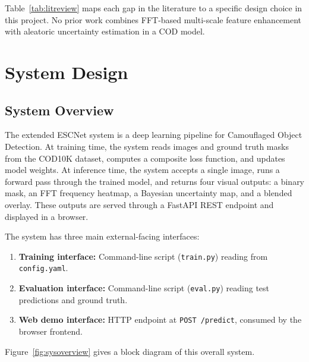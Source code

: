 \documentclass[12pt,a4paper]{report}
\begin{document}
\noindent Table~\ref{tab:litreview} maps each gap in the literature to a specific design choice in this project. No prior work combines FFT-based multi-scale feature enhancement with aleatoric uncertainty estimation in a COD model.

\chapter{System Design}\label{chap:sysdesign}

\section{System Overview}

The extended ESCNet system is a deep learning pipeline for Camouflaged Object Detection. At training time, the system reads images and ground truth masks from the COD10K dataset, computes a composite loss function, and updates model weights. At inference time, the system accepts a single image, runs a forward pass through the trained model, and returns four visual outputs: a binary mask, an FFT frequency heatmap, a Bayesian uncertainty map, and a blended overlay. These outputs are served through a FastAPI REST endpoint and displayed in a browser.

The system has three main external-facing interfaces:
\begin{sloppypar}
\begin{enumerate}
  \item \textbf{Training interface:} Command-line script (\texttt{train.py}) reading from \texttt{config.yaml}.
  \item \textbf{Evaluation interface:} Command-line script (\texttt{eval.py}) reading test predictions and ground truth.
  \item \textbf{Web demo interface:} HTTP endpoint at \texttt{POST /predict}, consumed by the browser frontend.
\end{enumerate}
\end{sloppypar}

Figure~\ref{fig:sysoverview} gives a block diagram of this overall system.
\end{document}
